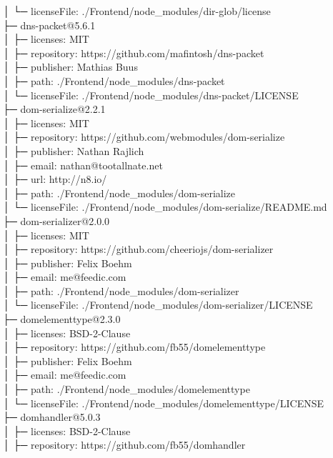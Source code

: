 │  └─ licenseFile: ./Frontend/node\_modules/dir-glob/license\\
├─ dns-packet@5.6.1\\
│  ├─ licenses: MIT\\
│  ├─ repository: https://github.com/mafintosh/dns-packet\\
│  ├─ publisher: Mathias Buus\\
│  ├─ path: ./Frontend/node\_modules/dns-packet\\
│  └─ licenseFile: ./Frontend/node\_modules/dns-packet/LICENSE\\
├─ dom-serialize@2.2.1\\
│  ├─ licenses: MIT\\
│  ├─ repository: https://github.com/webmodules/dom-serialize\\
│  ├─ publisher: Nathan Rajlich\\
│  ├─ email: nathan@tootallnate.net\\
│  ├─ url: http://n8.io/\\
│  ├─ path: ./Frontend/node\_modules/dom-serialize\\
│  └─ licenseFile: ./Frontend/node\_modules/dom-serialize/README.md\\
├─ dom-serializer@2.0.0\\
│  ├─ licenses: MIT\\
│  ├─ repository: https://github.com/cheeriojs/dom-serializer\\
│  ├─ publisher: Felix Boehm\\
│  ├─ email: me@feedic.com\\
│  ├─ path: ./Frontend/node\_modules/dom-serializer\\
│  └─ licenseFile: ./Frontend/node\_modules/dom-serializer/LICENSE\\
├─ domelementtype@2.3.0\\
│  ├─ licenses: BSD-2-Clause\\
│  ├─ repository: https://github.com/fb55/domelementtype\\
│  ├─ publisher: Felix Boehm\\
│  ├─ email: me@feedic.com\\
│  ├─ path: ./Frontend/node\_modules/domelementtype\\
│  └─ licenseFile: ./Frontend/node\_modules/domelementtype/LICENSE\\
├─ domhandler@5.0.3\\
│  ├─ licenses: BSD-2-Clause\\
│  ├─ repository: https://github.com/fb55/domhandler\\
